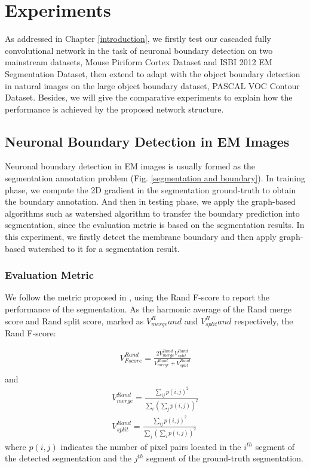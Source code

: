 \documentclass[senior]{IPSstyle}
\begin{document}


\chapter{Experiments} \label{experiments}
As addressed in Chapter \ref{introduction}, we firstly test our cascaded fully convolutional network in the task of neuronal boundary detection on two mainstream datasets, Mouse Piriform Cortex Dataset\cite{Lee2015} and ISBI 2012 EM Segmentation Dataset\cite{Ronneberger2015}, then extend to adapt with the object boundary detection in natural images on the large object boundary dataset, PASCAL VOC Contour Dataset\cite{Yang2016}. Besides, we will give the comparative experiments to explain how the performance is achieved by the proposed network structure.

\section{Neuronal Boundary Detection in EM Images}

Neuronal boundary detection in EM images is usually formed as the segmentation annotation problem (Fig. \ref{segmentation and boundary}). In training phase, we compute the 2D gradient in the segmentation ground-truth to obtain the boundary annotation. And then in testing phase, we apply the graph-based algorithms such as watershed algorithm to transfer the boundary prediction into segmentation, since the evaluation metric is based on the segmentation results. In this experiment, we firstly detect the membrane boundary and then apply graph-based watershed\cite{Zlateski2015} to it for a segmentation result.

\subsection{Evaluation Metric}

We follow the metric proposed in \cite{Lee2015}, using the Rand F-score to report the performance of the segmentation. As the harmonic average of the Rand merge score and Rand split score, marked as \(V_{merge}^Rand\) and \(V_{split}^Rand\) respectively, the Rand F-score:

\begin{eqnarray}
V_{Fscore}^{Rand} = \frac{2 V_{merge}^{Rand} V_{split}^{Rand}}{V_{merge}^{Rand} + V_{split}^{Rand}}\\
\end{eqnarray}
and 
\begin{eqnarray}
V_{merge}^{Rand} = \frac{\sum_{ij} p(i, j)^2}{\sum_i(\sum_j p(i, j))^2} \\
V_{split}^{Rand} = \frac{\sum_{ij} p(i, j)^2}{\sum_j(\sum_i p(i, j))^2}
\end{eqnarray}
where \(p(i, j)\) indicates the number of pixel pairs located in the \(i^{th}\) segment of the detected segmentation and the \(j^{th}\) segment of the ground-truth segmentation.
\end{document}
